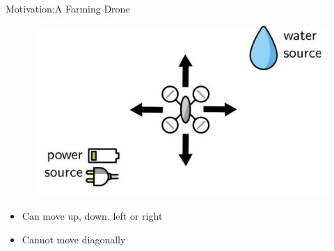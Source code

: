\documentclass[usenames,dvipsnames]{beamer}
\begin{document}

\begin{frame}{Motivation:A Farming Drone}
    \begin{figure}
        \centering
        \includegraphics[scale=0.15]{images/drone-move.jpg}
    \end{figure}
    \begin{itemize}
        \item Can move up, down, left or right
        \item Cannot move diagonally
    \end{itemize}
\end{frame}


\end{document}
